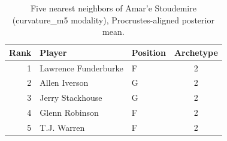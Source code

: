 \begin{table}[htbp]
  \centering\small
  \begin{tabular}{rllc}
    \toprule
    Rank & Player & Position & Archetype \\
    \midrule
    1 & Lawrence Funderburke & F & 2 \\
    2 & Allen Iverson & G & 2 \\
    3 & Jerry Stackhouse & G & 2 \\
    4 & Glenn Robinson & F & 2 \\
    5 & T.J. Warren & F & 2 \\
    \bottomrule
  \end{tabular}
  \caption{Five nearest neighbors of Amar'e Stoudemire (curvature_m5 modality), Procrustes-aligned posterior mean.}
  \label{tab:Amar_e_Stoudemire_neighbors_curvature_m5}
\end{table}

